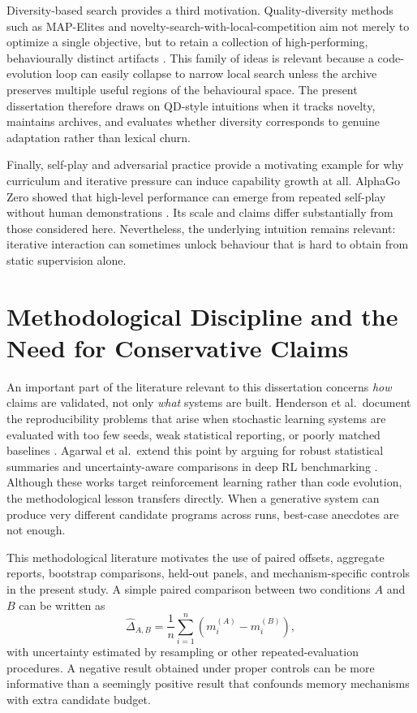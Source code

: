 Diversity-based search provides a third motivation. Quality-diversity methods such as MAP-Elites
and novelty-search-with-local-competition aim not merely to optimize a single objective, but to
retain a collection of high-performing, behaviourally distinct artifacts
\cite{mouret2015mapelites,pugh2016qd}. This family of ideas is relevant because a code-evolution
loop can easily collapse to narrow local search unless the archive preserves multiple useful
regions of the behavioural space. The present dissertation therefore draws on QD-style intuitions
when it tracks novelty, maintains archives, and evaluates whether diversity corresponds to genuine
adaptation rather than lexical churn.

Finally, self-play and adversarial practice provide a motivating example for why curriculum and
iterative pressure can induce capability growth at all. AlphaGo Zero showed that high-level
performance can emerge from repeated self-play without human demonstrations \cite{silver2017alphagozero}.
Its scale and claims differ substantially from those considered here. Nevertheless, the underlying
intuition remains relevant: iterative interaction can sometimes unlock behaviour that is hard to
obtain from static supervision alone.

\section{Methodological Discipline and the Need for Conservative Claims}
\label{sec:lit-methodology}

An important part of the literature relevant to this dissertation concerns \emph{how} claims are
validated, not only \emph{what} systems are built. Henderson et al.\ document the reproducibility
problems that arise when stochastic learning systems are evaluated with too few seeds, weak
statistical reporting, or poorly matched baselines \cite{henderson2018drltm}. Agarwal et al.\
extend this point by arguing for robust statistical summaries and uncertainty-aware comparisons in
deep RL benchmarking \cite{agarwal2021precipice}. Although these works target reinforcement
learning rather than code evolution, the methodological lesson transfers directly. When a
generative system can produce very different candidate programs across runs, best-case anecdotes are
not enough.

This methodological literature motivates the use of paired offsets, aggregate reports, bootstrap
comparisons, held-out panels, and mechanism-specific controls in the present study. A simple paired
comparison between two conditions $A$ and $B$ can be written as
\begin{equation}
\hat{\Delta}_{A,B} = \frac{1}{n}\sum_{i=1}^{n}\left(m_i^{(A)} - m_i^{(B)}\right),
\label{eq:lit-paired-delta}
\end{equation}
with uncertainty estimated by resampling or other repeated-evaluation procedures. A negative result
obtained under proper controls can be more informative than a seemingly positive result that
confounds memory mechanisms with extra candidate budget.

